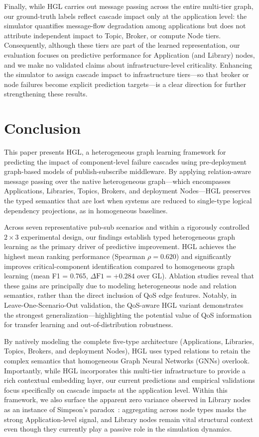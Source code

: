 \documentclass[sigconf,9pt,anonymous]{acmart}
\begin{document}
Finally, while HGL carries out message passing across the entire multi-tier graph, our ground-truth labels reflect cascade impact only at the application level: the simulator quantifies message-flow degradation among applications but does not attribute independent impact to Topic, Broker, or compute Node tiers. Consequently, although these tiers are part of the learned representation, our evaluation focuses on predictive performance for Application (and Library) nodes, and we make no validated claims about infrastructure-level criticality. Enhancing the simulator to assign cascade impact to infrastructure tiers—so that broker or node failures become explicit prediction targets—is a clear direction for further strengthening these results.

\section{Conclusion}

This paper presents HGL, a heterogeneous graph learning framework for predicting the impact of component-level failure cascades using pre-deployment graph-based models of publish-subscribe middleware. By applying relation-aware message passing over the native heterogeneous graph—which encompasses Applications, Libraries, Topics, Brokers, and deployment Nodes—HGL preserves the typed semantics that are lost when systems are reduced to single-type logical dependency projections, as in homogeneous baselines.

Across seven representative pub-sub scenarios and within a rigorously controlled $2\times3$ experimental design, our findings establish typed heterogeneous graph learning as the primary driver of predictive improvement. HGL achieves the highest mean ranking performance (Spearman $\rho=0.620$) and significantly improves critical-component identification compared to homogeneous graph learning (mean F1 = 0.765, $\Delta\text{F1}=+0.284$ over GL). Ablation studies reveal that these gains are principally due to modeling heterogeneous node and relation semantics, rather than the direct inclusion of QoS edge features. Notably, in Leave-One-Scenario-Out validation, the QoS-aware HGL variant demonstrates the strongest generalization—highlighting the potential value of QoS information for transfer learning and out-of-distribution robustness.

By natively modeling the complete five-type architecture (Applications, Libraries, Topics, Brokers, and deployment Nodes), HGL uses typed relations to retain the complex semantics that homogeneous Graph Neural Networks (GNNs) overlook. Importantly, while HGL incorporates this multi-tier infrastructure to provide a rich contextual embedding layer, our current predictions and empirical validations focus specifically on cascade impacts at the application level. Within this framework, we also surface the apparent zero variance observed in Library nodes as an instance of Simpson's paradox~\cite{simpson1951interpretation, bickel1975berkeley}: aggregating across node types masks the strong Application-level signal, and Library nodes remain vital structural context even though they currently play a passive role in the simulation dynamics.
\end{document}
